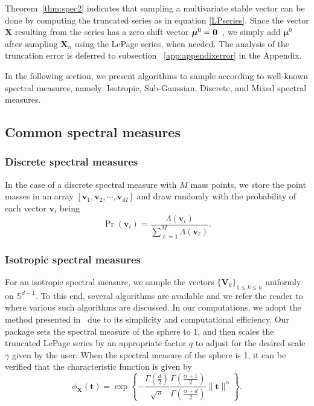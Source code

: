 Theorem~\ref{thm:spec2} indicates that sampling a multivariate stable vector can be done by computing the truncated series as in equation \eqref{LPseries}. Since the vector $\mathbf{X}$ resulting from the series has a zero shift vector $\boldsymbol{\mu}^0 = {\bf 0}$~\cite[Remark 1]{BentkusV.2001LSRo}, we simply add $\boldsymbol{\mu}^0$ after sampling $\mathbf{X}_n$ using the LePage series, when needed. The analysis of the truncation error is deferred to subsection ~\ref{app:appendixerror} in the Appendix.

In the following section, we present algorithms to sample according to well-known spectral measures, namely: Isotropic, Sub-Gaussian, Discrete, and Mixed spectral measures.

\subsection{Common spectral measures}

\subsubsection{Discrete spectral measures}

In the case of a discrete spectral measure with $M$ mass points, we store the point masses in an array $[\mathbf{v}_1, \mathbf{v}_2, \cdots, \mathbf{v}_M]$ and draw randomly with the probability of each vector $\mathbf{v}_{i}$
being
\[
\Pr(\mathbf{v}_{i})=\frac{\Lambda(\mathbf{v}_{i})}{\sum_{\ell=1}^{M}\Lambda(\mathbf{v}_{\ell})}.
\]

\subsubsection{Isotropic spectral measures}
\label{sc:Iso}

For an isotropic spectral measure, we sample the vectors $\{\mathbf{V}_k\}_{1 \leq k \leq n}$ uniformly on $\mathbb{S}^{d-1}$. To this end, several algorithms are available and we refer the reader to~\cite{SchnabelStefan2022Asaf} where various such algorithms are discussed. In our computations, we adopt the method presented in~\cite{MullerMervinE.1959Anoa} due to its simplicity and computational efficiency. Our package sets the spectral measure of the sphere to $1$, and then scales the truncated LePage series by an appropriate factor $q$ to adjust for the desired scale $\gamma$ given by the user: When the spectral measure of the sphere is 1, it can be verified that the characteristic function is given by
\begin{equation*}
    \phi_{\mathbf{X}}(\mathbf{t})=\exp\left\{-\frac{\Gamma\left(\frac{d}{2}\right)}{\sqrt{\pi}}\frac{\Gamma\left(\frac{\alpha+1}{2}\right)}{\Gamma\left(\frac{\alpha+d}{2}\right)}\|\mathbf{t}\|^{\alpha}\right\}.
\end{equation*}


